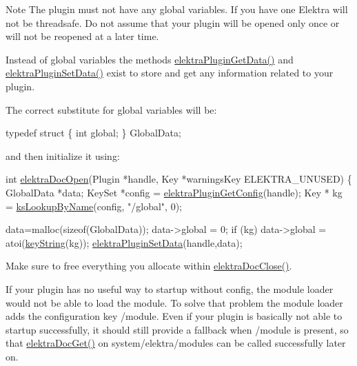 \begin{DoxyNote}{Note}
The plugin must not have any global variables. If you have one Elektra will not be threadsafe. Do not assume that your plugin will be opened only once or will not be reopened at a later time.
\end{DoxyNote}
Instead of global variables the methods \hyperlink{group__plugin_gaafcf3216b46292f222b8cc7828b4dd20}{elektra\+Plugin\+Get\+Data()} and \hyperlink{group__plugin_gaf4b941a52ff55d0ca2a9158d90208ef2}{elektra\+Plugin\+Set\+Data()} exist to store and get any information related to your plugin.

The correct substitute for global variables will be\+:


\begin{DoxyCodeInclude}
\textcolor{keyword}{typedef} \textcolor{keyword}{struct }\{ \textcolor{keywordtype}{int} global; \} GlobalData;
\end{DoxyCodeInclude}
 and then initialize it using\+:


\begin{DoxyCodeInclude}
\textcolor{keywordtype}{int} \hyperlink{group__plugin_ga23c2eb3584e38a4d494eb8f91e5e3d8d}{elektraDocOpen}(Plugin *handle, Key *warningsKey ELEKTRA\_UNUSED)
\{
        GlobalData *data;
        KeySet *config = \hyperlink{group__plugin_ga644bead796506c172817724051c977c9}{elektraPluginGetConfig}(handle);
        Key * kg = \hyperlink{group__keyset_gad2e30fb6d4739d917c5abb2ac2f9c1a1}{ksLookupByName}(config, \textcolor{stringliteral}{"/global"}, 0);

        data=malloc(\textcolor{keyword}{sizeof}(GlobalData));
        data->global = 0;
        \textcolor{keywordflow}{if} (kg) data->global = atoi(\hyperlink{group__keyvalue_ga880936f2481d28e6e2acbe7486a21d05}{keyString}(kg));
        \hyperlink{group__plugin_gaf4b941a52ff55d0ca2a9158d90208ef2}{elektraPluginSetData}(handle,data);
\end{DoxyCodeInclude}
 Make sure to free everything you allocate within \hyperlink{group__plugin_ga1236aefe5b2baf8b7bf636ba5aa9ea29}{elektra\+Doc\+Close()}.

If your plugin has no useful way to startup without config, the module loader would not be able to load the module. To solve that problem the module loader adds the configuration key /module. Even if your plugin is basically not able to startup successfully, it should still provide a fallback when /module is present, so that \hyperlink{group__plugin_gacb69f3441c6d84241b4362f958fbe313}{elektra\+Doc\+Get()} on system/elektra/modules can be called successfully later on.


